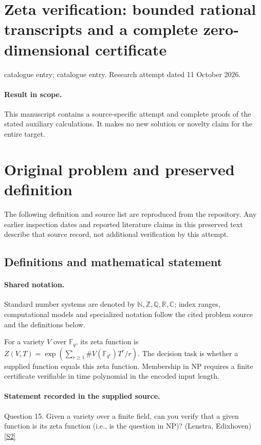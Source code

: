 \documentclass[11pt]{article}
\begin{document}
\section*{Zeta verification: bounded rational transcripts and a complete zero-dimensional certificate}
\noindent catalogue entry; catalogue entry. Research attempt dated 11 October 2026.
\paragraph{Result in scope.}This manuscript contains a source-specific attempt and complete proofs of the stated auxiliary calculations. It makes no new solution or novelty claim for the entire target.
\section{Original problem and preserved definition}
The following definition and source list are reproduced from the repository. Any earlier inspection dates and reported literature claims in this preserved text describe that source record, not additional verification by this attempt.
\subsection{Definitions and mathematical statement}

\paragraph{Shared notation.}Standard number systems are denoted by $\mathbb N,\mathbb Z,\mathbb Q,\mathbb R,\mathbb C$; index ranges, computational models and specialized notation follow the cited problem source and the definitions below.


For a variety $V$ over $\mathbb F_q$, its zeta function is $Z(V,T)=\exp(\sum_{r\ge1}\#V(\mathbb F_{q^r})T^r/r)$. The decision task is whether a supplied function equals this zeta function. Membership in NP requires a finite certificate verifiable in time polynomial in the encoded input length.
\paragraph{Statement recorded in the supplied source.}
Question 15. Given a variety over a finite field, can you verify that a given function is its zeta function (i.e., is the question in NP)? (Lenstra, Edixhoven) \href{https://aimath.org/WWN/primesinp/primesinp.pdf}{[S2]}
\end{document}
